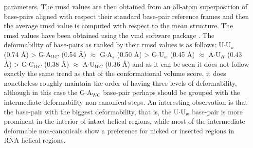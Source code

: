 parameters.   The  rmsd values  are  then  obtained  from an  all-atom
superposition  of  base-pairs  aligned  with  respect  their  standard
base-pair reference frames and then the average rmsd value is computed
with respect to the mean structure. The rmsd values have been obtained
using the  vmd software package  \cite{eargle2006}.  The deformability
of  base-pairs  as  ranked  by   their  rmsd  values  is  as  follows:
U$\cdot$U$_{w}$  (0.74 \AA)  > G$\cdot$A$_{WC}$  (0.54  \AA) $\approx$
G$\cdot$A$_{s}$  (0.50  \AA) >  G$\cdot$U$_{w}$  (0.45 \AA)  $\approx$
A$\cdot$U$_{H}$  (0.43 \AA)  > G$\cdot$C$_{WC}$  (0.38  \AA) $\approx$
A$\cdot$U$_{WC}$ (0.36 \AA)  and as it can be seen  it does not follow
exactly the same trend as  that of the conformational volume score, it
does nonetheless roughly maintain the  order of having three levels of
deformability,  although  in  this  case  the  G$\cdot$A$_{\text{WC}}$
base-pair   perhaps   should   be   grouped  with   the   intermediate
deformability non-canonical steps.  An interesting observation is that
the   base-pair  with   the  biggest   deformability,  that   is,  the
U$\cdot$U$_{\text{w}}$ base-pair is more  prominent in the interior of
intact  helical regions,  while  most of  the intermediate  deformable
non-canonicals show a preference for nicked or inserted regions in RNA
helical regions.

